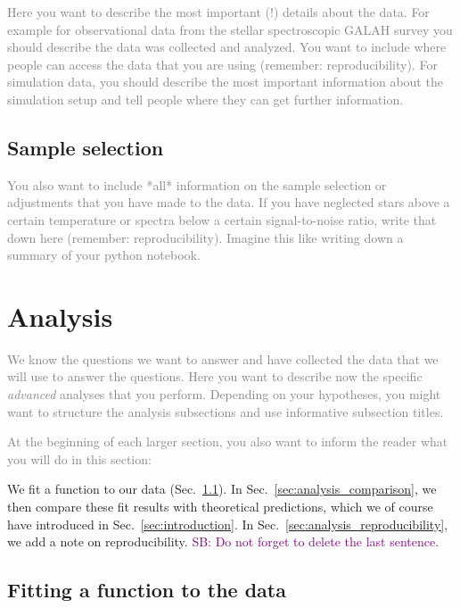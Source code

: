 \documentclass[
  journal=pasa,
  manuscript=Research-Article,
  year=2025,
  volume=X,
]{cup-journal}
\newcommand{\SB}[1]{{\textcolor{purple}{SB: #1}}}
\newcommand{\comment}[1]{\textcolor{gray}{#1}}
\begin{document}
\comment{Here you want to describe the most important (!) details about the data. For example for observational data from the stellar spectroscopic GALAH survey \citep{Buder2018, Buder2021, Buder2024b} you should describe the data was collected and analyzed. You want to include where people can access the data that you are using (remember: reproducibility). For simulation data, you should describe the most important information about the simulation setup and tell people where they can get further information.}

\subsection{Sample selection} \label{sec:data_selection}

\comment{You also want to include *all* information on the sample selection or adjustments that you have made to the data. If you have neglected stars above a certain temperature or spectra below a certain signal-to-noise ratio, write that down here (remember: reproducibility). Imagine this like writing down a summary of your python notebook.}

\clearpage
\section{Analysis} \label{sec:analysis}

\comment{We know the questions we want to answer and have collected the data that we will use to answer the questions. Here you want to describe now the specific \textit{advanced} analyses that you perform. Depending on your hypotheses, you might want to structure the analysis subsections and use informative subsection titles.}

\comment{At the beginning of each larger section, you also want to inform the reader what you will do in this section:}

We fit a function to our data (Sec.~\ref{sec:analysis_fitting}). In Sec.~\ref{sec:analysis_comparison}, we then compare these fit results with theoretical predictions, which we of course have introduced in Sec.~\ref{sec:introduction}. In Sec.~\ref{sec:analysis_reproducibility}, we add a note on reproducibility. \SB{Do not forget to delete the last sentence.}

\subsection{Fitting a function to the data} \label{sec:analysis_fitting}
\end{document}
